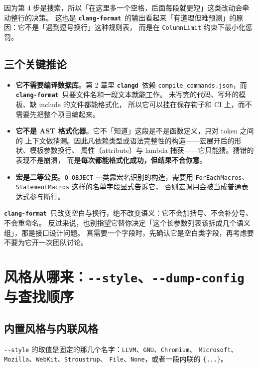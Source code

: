 \documentclass[12pt,a4paper,fontset=fandol]{ctexbook}
\newcommand{\Opt}[1]{\texttt{-\/-#1}}
\newcommand{\Bk}{\discretionary{}{}{}}
\newcommand{\Lib}[1]{\textbf{\texttt{#1}}}
\newcommand{\Fmt}{\Lib{clang-format}}
\newcommand{\CD}{\Lib{clangd}}
\begin{document}
因为第 4 步是搜索，所以「在这里多一个空格，后面每段就更短」这类改动会牵动整行的决策。
这也是 \Fmt\ 的输出看起来「有道理但难预测」的原因：它不是「遇到逗号换行」这种规则表，
而是在 \texttt{ColumnLimit} 约束下最小化惩罚。

\subsection*{三个关键推论}
\begin{itemize}
  \item \textbf{它不需要编译数据库}。第 2 章里 \CD\ 依赖
    \texttt{compile\_{\Bk}commands.json}，而 \Fmt\ 只要文件名和一段文本就能工作。
    未写完的代码、写坏的模板、缺 include 的文件都能格式化，
    所以它可以挂在保存钩子和 CI 上，而不需要先把整个项目编起来。
  \item \textbf{它不是 AST 格式化器}。它不「知道」这段是不是函数定义，只对 token 之间的
    上下文做猜测。因此凡依赖类型或语法完整性的构造——宏展开后的形状、模板参数换行、
    属性（attribute）与 lambda 捕获——它只能猜。猜错的表现不是崩溃，
    而是\textbf{每次都能格式化成功，但结果不合你意}。
  \item \textbf{宏是二等公民}。\texttt{Q\_OBJECT} 一类靠宏名识别的构造，需要用
    \texttt{For{\Bk}Each{\Bk}Macros}、\texttt{Statement{\Bk}Macros} 这样的名单字段显式告诉它，
    否则宏调用会被当成普通表达式参与断行。
\end{itemize}

\begin{guideline}[title={把 \Fmt\ 当排版器，不要当重构器}]
  \Fmt\ 只改变空白与换行，绝不改变语义：它不会加括号、不会补分号、不会重命名。
  反过来说，也别指望它替你决定「这个长参数列表该拆成几个语义组」，那是接口设计问题。
  真需要一个字段时，先确认它是空白类字段，再考虑要不要为它开一次团队讨论。
\end{guideline}

\section{风格从哪来：\Opt{style}、\Opt{dump-config} 与查找顺序}\label{sec:ch09-s2}

\subsection{内置风格与内联风格}\label{sec:ch09-s2-inline}

\Opt{style} 的取值是固定的那几个名字：\texttt{LLVM}、\texttt{GNU}、\texttt{Chromium}、
\texttt{Microsoft}、\texttt{Mozilla}、\texttt{WebKit}、\texttt{Stroustrup}、
\texttt{File}、\texttt{None}，或者一段内联的 \texttt{\{...\}}。
\end{document}

